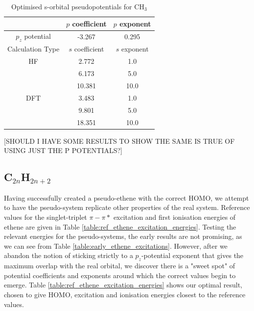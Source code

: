 \documentclass[journal=jctcce,manuscript=article]{achemso}
\begin{document}
\begin{table}[ht]
\caption{Optimised s-orbital pseudopotentials for CH\(_{3}\)}
\begin{tabular}{c c c}
\hline\hline
& \(p\) coefficient & \(p\) exponent \\
\hline
\(p_{z}\) potential & -3.267 & 0.295 \\
\hline
Calculation Type & \(s\) coefficient & \(s\) exponent \\
\hline
HF & 2.772 & 1.0 \\
 & 6.173 & 5.0 \\
 & 10.381 & 10.0 \\
\hline
DFT & 3.483 & 1.0 \\
 & 9.801 & 5.0 \\
 & 18.351 & 10.0 \\
\hline
\end{tabular}
\label{table:ch3_p_potentials}
\end{table}

[SHOULD I HAVE SOME RESULTS TO SHOW THE SAME IS TRUE OF USING JUST THE P POTENTIALS?]

\subsection{C\(_{2n}\)H\(_{2n+2}\)}

Having successfully created a pseudo-ethene with the correct HOMO, we attempt to have the pseudo-system replicate other properties of the real system. Reference values for the singlet-triplet \(\pi-\pi*\) excitation and first ionisation energies of ethene are given in Table \ref{table:ref_ethene_excitation_energies}. Testing the relevant energies for the pseudo-systems, the early results are not promising, as we can see from Table \ref{table:early_ethene_excitations}. However, after we abandon the notion of sticking strictly to a \(p_{z}\)-potential exponent that gives the maximum overlap with the real orbital, we discover there is a "sweet spot" of potential coefficients and exponents around which the correct values begin to emerge. Table \ref{table:ref_ethene_excitation_energies} shows our optimal result, chosen to give HOMO, excitation and ionisation energies closest to the reference values. 
\end{document}
